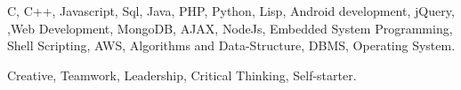 



\begin{cventries}

\cvproject
{
    \begin{cvitems} %
        \item {C, C++, Javascript, Sql, Java, PHP, Python, Lisp, Android development, jQuery, ,Web Development, MongoDB, AJAX, NodeJs, Embedded System Programming, Shell Scripting, AWS, Algorithms and Data-Structure, DBMS, Operating System.}
        \item { Creative, Teamwork, Leadership, Critical Thinking, Self-starter.}
        \end{cvitems}
}

\end{cventries}